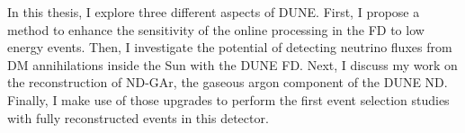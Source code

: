 In this thesis, I explore three different aspects of DUNE. First, I propose a method to enhance the sensitivity of the online processing in the FD to low energy events. Then, I investigate the potential of detecting neutrino fluxes from DM annihilations inside the Sun with the DUNE FD. Next, I discuss my work on the reconstruction of ND-GAr, the gaseous argon component of the DUNE ND. Finally, I make use of those upgrades to perform the first event selection studies with fully reconstructed events in this detector.

\begin{comment}
This thesis opens with an overview of the status of neutrino physics in Chapter \ref{chapter:neutrinos}. I start summarising the role that neutrinos play in the SM, to then focus on the developments that lead to the discovery of neutrino oscillations and how to accommodate massive neutrinos in the model. I then discuss the phenomenology of the neutrino oscillations, as well as the current experimental landscape and open questions. In the final section, I review the basics of the neutrino-nucleus interaction modelling, which is of great importance for DUNE.

Chapter \ref{chapter:dune} introduces DUNE, its physics programme and various components. I give detail descriptions of the LBNF beamline, the near detector and the far detector designs. I also discuss the current staging plans for DUNE. This leads to the of ND-GAr, the more capable near detector planned for DUNE Phase II.

In Chapter \ref{chapter:matched_filter} I start by reviewing how the trigger primitives (\gls{tp}s), the basic building blocks of the DUNE far detector trigger chain, are formed. I then motivate how to use the filtering to enhance the TP generation in the induction channels. I describe the concept of matched filter, and how to optimise it using ProtoDUNE-SP data. I use different MC samples to study its performance, and assess how it improves the hit finding. Finally, I present the results of the tests we performed at the VD ColdBox setup at CERN, were for the first time we collected TP data with a matched filter.

The solar DM analysis is presented in Chapter \ref{chapter:dm_analysis}. After reviewing the theoretical basis for the solar DM capture and how capture and annihilation rates are related, I introduce the analysis framework used. I then focus on the event selection studies based on two topologies: high-energy DIS events and low-energy $1\mu1p$ QE events. I use these to extract the projected sensitivities for the DM-nucleon scattering cross section, and compare them to the current status of other direct and indirect DM searches. Additionally, I discuss the potential of DUNE in two specific DM models. I end with a discussion of the systematic uncertainties relevant for this analysis.


\end{comment}
